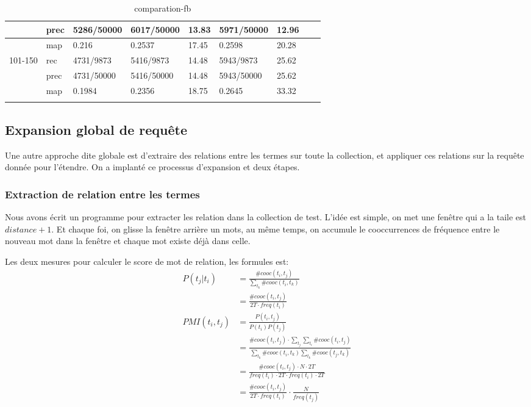 \documentclass[a4paper]{article}
\begin{document}
\begin{table}[htp]
\begin{tabular}{|l|l|l|l|l|l|l|l|l|}
        & prec & 5286/50000 & 6017/50000  & 13.83  & 5971/50000  & 12.96 &            &          \\ \hline
        & map       & 0.216      & 0.2537      & 17.45  & 0.2598      & 20.28 &            &          \\ \hline
101-150 & rec    & 4731/9873  & 5416/9873   & 14.48  & 5943/9873   & 25.62 &            &          \\ \hline
        & prec & 4731/50000 & 5416/50000  & 14.48  & 5943/50000  & 25.62 &            &          \\ \hline
        & map       & 0.1984     & 0.2356      & 18.75  & 0.2645      & 33.32 &            &          \\ \hline
        &           &            &             &          &             &         &            &          \\ \hline
\end{tabular}
\caption{comparation-fb}
\label{tab:comp_fb}
\end{table}

\subsection{Expansion global de requête}
Une autre approche dite globale est d’extraire des relations entre les termes sur
toute la collection, et appliquer ces relations sur la requête donnée pour l’étendre. On a implanté ce processus d’expansion et deux étapes. 

\subsubsection{Extraction de relation entre les termes}
Nous avons écrit un programme pour extracter les relation dans la collection de test. L'idée est simple, on met une fenêtre qui a la taile est $distance+1$. Et chaque foi, on glisse la fenêtre arrière un mots, au même temps, on accumule le cooccurrences de fréquence entre le nouveau mot dans la fenêtre  et chaque mot existe déjà dans celle. 

Les deux mesures pour calculer le score de mot de relation, les formules est:
\begin{align}
P(t_j|t_i)&=\frac{\#cooc(t_i,t_j)}{\sum_{t_k}{\#cooc(t_i,t_k)}} \label{eq:ptji1} \\
&=\frac{\#cooc(t_i,t_j)}{2T\cdot freq(t_i)} \label{eq:ptji2} \\
PMI(t_i,t_j)&=\frac{P(t_i,t_j)}{P(t_i)P(t_j)} \\
&=\frac{\#cooc(t_i,t_j)\cdot \sum_{t_j}\sum_{t_i}\#cooc(t_i,t_j)}
{\sum_{t_k}{\#cooc(t_i,t_k)}\sum_{t_k}{\#cooc(t_j,t_k)}} \\
&=\frac{\#cooc(t_i,t_j)\cdot N \cdot 2T}
{freq(t_i)\cdot 2T\cdot freq(t_i)\cdot 2T } \\
&=\frac{\#cooc(t_i,t_j)}{2T\cdot freq(t_i)}\cdot \frac{N}{freq(t_j)} \label{eq:ptji3}
\end{align}
\end{document}
